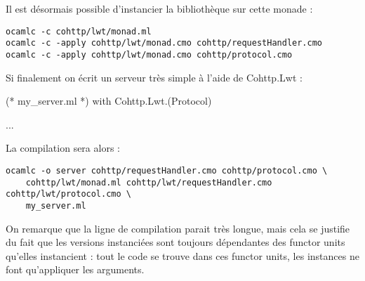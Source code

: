 \documentclass[11pt,a4paper]{report}
\begin{document}
Il est désormais possible d'instancier la bibliothèque sur cette monade :

\begin{verbatim}
ocamlc -c cohttp/lwt/monad.ml
ocamlc -c -apply cohttp/lwt/monad.cmo cohttp/requestHandler.cmo
ocamlc -c -apply cohttp/lwt/monad.cmo cohttp/protocol.cmo
\end{verbatim}

Si finalement on écrit un serveur très simple à l'aide de Cohttp.Lwt :
\begin{OCaml}
(* my_server.ml *)
with Cohttp.Lwt.(Protocol)

...
\end{OCaml}

La compilation sera alors :

\begin{verbatim}
ocamlc -o server cohttp/requestHandler.cmo cohttp/protocol.cmo \
    cohttp/lwt/monad.ml cohttp/lwt/requestHandler.cmo cohttp/lwt/protocol.cmo \
    my_server.ml 
\end{verbatim}

On remarque que la ligne de compilation parait très longue, mais cela se
justifie du fait que les versions instanciées sont toujours dépendantes des
functor units qu'elles instancient : tout le code se trouve dans ces functor
units, les instances ne font qu'appliquer les arguments.


\end{document}
